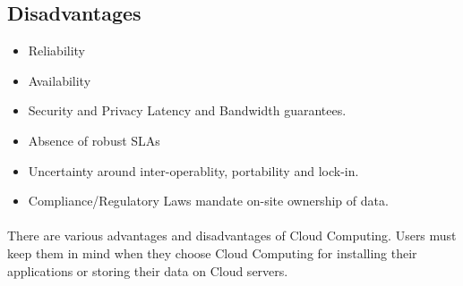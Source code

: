 \subsection{Disadvantages}
\begin{itemize}
    \item Reliability
    \item Availability
    \item Security and Privacy Latency and Bandwidth guarantees.
    \item Absence of robust SLAs
    \item Uncertainty around inter-operablity, portability and lock-in.
    \item Compliance/Regulatory Laws mandate on-site ownership of data.
\end{itemize}

\paragraph{\hspace{24pt}}
There are various advantages and disadvantages of Cloud Computing. Users must keep them in mind when they choose Cloud Computing for installing their applications or storing their data on Cloud servers.